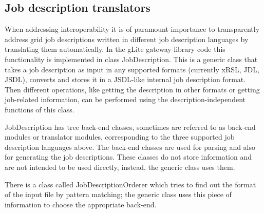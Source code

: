 \documentclass{article}
\begin{document}
\subsection{Job description translators}
\label{Job description}
When addressing interoperability it is of paramount importance to transparently address grid job descriptions written in different job description languages by translating them automatically. In the gLite gateway library code this functionality is implemented in class JobDescription. This is a generic class that takes a job description as input in any supported formats (currently xRSL, JDL, JSDL), converts and stores it in a JSDL-like internal job description format. Then different operations, like getting the description in other formats or getting job-related information, can be performed using the description-independent functions of this class.\par
JobDescription has tree back-end classes, sometimes are referred to as back-end modules or translator modules, corresponding to the three supported job description languages above. The back-end classes are used for parsing and also for generating the job descriptions. These classes do not store information and are not intended to be used directly, instead, the generic class uses them.\par
There is a class called JobDescriptionOrderer which tries to find out the format of the input file by pattern matching; the generic class uses this piece of information to choose the appropriate back-end.
\begin{figure}[ht]
\end{figure}
\end{document}
